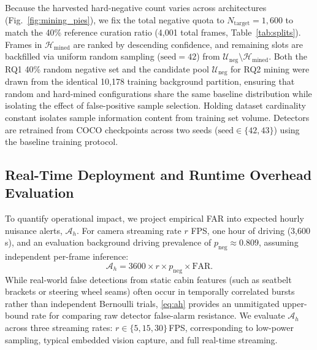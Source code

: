 \documentclass[conference]{IEEEtran}
\begin{document}
Because the harvested hard-negative count varies across architectures (Fig.~\ref{fig:mining_pies}), we fix the total negative quota to $N_{\mathrm{target}} = 1{,}600$ to match the 40\% reference curation ratio (4,001 total frames, Table~\ref{tab:splits}). Frames in $\mathcal{H}_{\mathrm{mined}}$ are ranked by descending confidence, and remaining slots are backfilled via uniform random sampling ($\text{seed} = 42$) from $\mathcal{U}_{\mathrm{neg}} \setminus \mathcal{H}_{\mathrm{mined}}$. Both the RQ1 40\% random negative set and the candidate pool $\mathcal{U}_{\mathrm{neg}}$ for RQ2 mining were drawn from the identical 10{,}178 training background partition, ensuring that random and hard-mined configurations share the same baseline distribution while isolating the effect of false-positive sample selection. Holding dataset cardinality constant isolates sample information content from training set volume. Detectors are retrained from COCO checkpoints across two seeds ($\text{seed} \in \{42, 43\}$) using the baseline training protocol.


\subsection{Real-Time Deployment and Runtime Overhead Evaluation}
\label{subsec:deployment}
To quantify operational impact, we project empirical FAR into expected hourly nuisance alerts, $\mathcal{A}_h$. For camera streaming rate $r$ FPS, one hour of driving (3,600\,s), and an evaluation background driving prevalence of $p_{\mathrm{neg}} \approx 0.809$, assuming independent per-frame inference:
\begin{equation}
\mathcal{A}_h = 3600 \times r \times p_{\mathrm{neg}} \times \text{FAR}.
\label{eq:ah}
\end{equation}
While real-world false detections from static cabin features (such as seatbelt brackets or steering wheel seams) often occur in temporally correlated bursts rather than independent Bernoulli trials, \eqref{eq:ah} provides an unmitigated upper-bound rate for comparing raw detector false-alarm resistance. We evaluate $\mathcal{A}_h$ across three streaming rates: $r \in \{5, 15, 30\}$\,FPS, corresponding to low-power sampling, typical embedded vision capture, and full real-time streaming.
\end{document}
